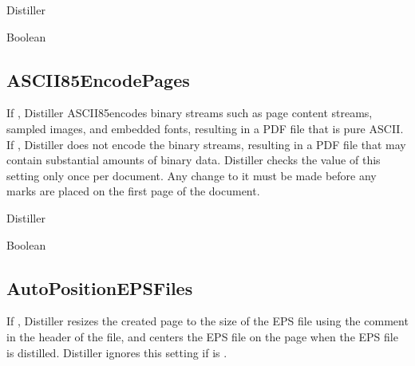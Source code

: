 \documentclass[letterpaper,12pt,english,openany,oneside]{sphinxmanual}
\begin{document}
Distiller

\label{\detokenize{PDF_Create_CommonSettings:type-86}}

Boolean

\label{\detokenize{PDF_Create_CommonSettings:default-value-81}}

\begin{sphinxVerbatim}[commandchars=\\\{\}]
\end{sphinxVerbatim}


\subsection{ASCII85EncodePages}
\label{\detokenize{PDF_Create_CommonSettings:ascii85encodepages}}
If  , Distiller ASCII85\sphinxhyphen{}encodes binary streams such as page content streams, sampled images, and embedded fonts, resulting in a PDF file that is pure ASCII. If  , Distiller does not encode the binary streams, resulting in a PDF file that may contain substantial amounts of binary data. Distiller checks the value of this setting only once per document. Any change to it must be made before any marks are placed on the first page of the document.

\label{\detokenize{PDF_Create_CommonSettings:supported-by-88}}

Distiller

\label{\detokenize{PDF_Create_CommonSettings:type-87}}

Boolean

\label{\detokenize{PDF_Create_CommonSettings:default-value-82}}

\begin{sphinxVerbatim}[commandchars=\\\{\}]
\end{sphinxVerbatim}


\subsection{AutoPositionEPSFiles}
\label{\detokenize{PDF_Create_CommonSettings:autopositionepsfiles}}
If  , Distiller resizes the created page to the size of the EPS file using the  comment in the header of the file, and centers the EPS file on the page when the EPS file is distilled. Distiller ignores this setting if  is  .
\end{document}
